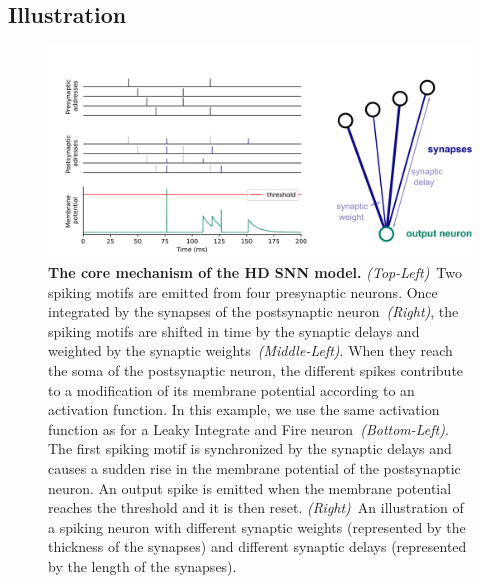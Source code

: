 \documentclass[landscape,a0]{a0poster}
\newcommand{\colorsubsec}{gray}
\begin{document}
\begin{multicols}{3}
\subsection*{\color{\colorsubsec}Illustration}
%
\begin{figure}[H]
    \centering
    \includegraphics[width=0.980\linewidth]{figures/HDSNN_graph.pdf}
    \caption{\textbf{The core mechanism of the HD SNN model.} \textit{(Top-Left)}~Two spiking motifs are emitted from four presynaptic neurons. Once integrated by the synapses of the postsynaptic neuron~\textit{(Right)}, the spiking motifs are shifted in time by the synaptic delays and weighted by the synaptic weights~\textit{(Middle-Left)}. When they reach the soma of the postsynaptic neuron, the different spikes contribute to a modification of its membrane potential according to an activation function. In this example, we use the same activation function as for a Leaky Integrate and Fire neuron~\textit{(Bottom-Left)}. The first spiking motif is synchronized by the synaptic delays and causes a sudden rise in the membrane potential of the postsynaptic neuron. An output spike is emitted when the membrane potential reaches the threshold and it is then reset.   \textit{(Right)}~An illustration of a spiking neuron with different synaptic weights (represented by the thickness of the synapses) and different synaptic delays (represented by the length of the synapses). }%
    \label{fig:izhikevich}%
\end{figure}

\end{multicols}
\end{document}
